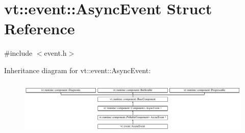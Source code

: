 \hypertarget{structvt_1_1event_1_1_async_event}{}\section{vt\+:\+:event\+:\+:Async\+Event Struct Reference}
\label{structvt_1_1event_1_1_async_event}


{\ttfamily \#include $<$event.\+h$>$}

Inheritance diagram for vt\+:\+:event\+:\+:Async\+Event\+:\begin{figure}[H]
\begin{center}
\leavevmode
\includegraphics[height=2.666667cm]{structvt_1_1event_1_1_async_event}
\end{center}
\end{figure}
